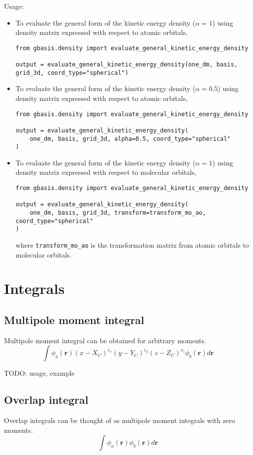 \documentclass[letterpaper]{article}
\begin{document}
Usage:
\begin{itemize}
\item To evaluate the general form of the kinetic energy density ($\alpha=1$)
  using density matrix expressed with respect to atomic orbitals,
\begin{verbatim}
from gbasis.density import evaluate_general_kinetic_energy_density

output = evaluate_general_kinetic_energy_density(one_dm, basis, grid_3d, coord_type="spherical")
\end{verbatim}
\item To evaluate the general form of the kinetic energy density ($\alpha=0.5$)
  using density matrix expressed with respect to atomic orbitals,
\begin{verbatim}
from gbasis.density import evaluate_general_kinetic_energy_density

output = evaluate_general_kinetic_energy_density(
    one_dm, basis, grid_3d, alpha=0.5, coord_type="spherical"
)
\end{verbatim}
\item To evaluate the general form of the kinetic energy density ($\alpha=1$)
  using density matrix expressed with respect to molecular orbitals,
\begin{verbatim}
from gbasis.density import evaluate_general_kinetic_energy_density

output = evaluate_general_kinetic_energy_density(
    one_dm, basis, grid_3d, transform=transform_mo_ao, coord_type="spherical"
)
\end{verbatim}
  where \verb|transform_mo_ao| is the transformation matrix from atomic orbitals
  to molecular orbitals.
\end{itemize}
\section{Integrals}
\subsection{Multipole moment integral}
Multipole moment integral can be obtained for arbitrary moments.
\begin{equation}
  \label{eq:multipole}
  \int \phi_a (\mathbf{r}) (x - X_C)^{c_x} (y - Y_C)^{c_y} (z - Z_C)^{c_z} \phi_b (\mathbf{r}) d\mathbf{r}
\end{equation}

TODO: usage, example
\subsection{Overlap integral}
Overlap integrals can be thought of as multipole moment integrals with zero moments.
\begin{equation}
  \label{eq:overlap}
  \int \phi_a (\mathbf{r}) \phi_b (\mathbf{r}) d\mathbf{r}
\end{equation}
\end{document}
